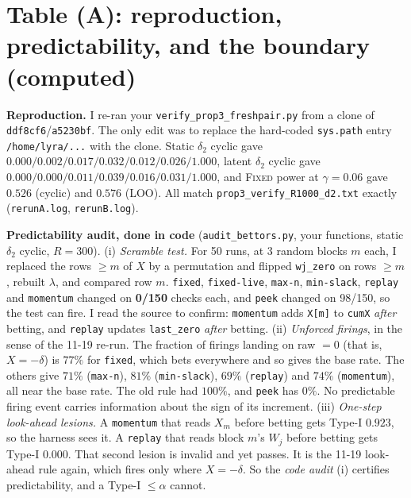 \documentclass[11pt]{article}
\begin{document}
\section{Table (A): reproduction, predictability, and the boundary (computed)}\label{sec:repro}
\textbf{Reproduction.} I re-ran your \texttt{verify\_prop3\_freshpair.py} from a clone of \texttt{ddf8cf6}/\texttt{a5230bf}. The only edit was to replace the hard-coded \texttt{sys.path} entry \texttt{/home/lyra/...} with the clone.
Static $\delta_2$ cyclic gave $0.000/0.002/0.017/0.032/0.012/0.026/1.000$, latent $\delta_2$ cyclic gave $0.000/0.000/0.011/0.039/0.016/0.031/1.000$, and \textsc{Fixed} power at $\gamma=0.06$ gave $0.526$ (cyclic) and $0.576$ (LOO). All match \texttt{prop3\_verify\_R1000\_d2.txt} exactly (\texttt{rerunA.log}, \texttt{rerunB.log}).

\textbf{Predictability audit, done in code} (\texttt{audit\_bettors.py}, your functions, static $\delta_2$ cyclic, $R=300$).
(i) \emph{Scramble test.} For 50 runs, at 3 random blocks $m$ each, I replaced the rows $\ge m$ of $X$ by a permutation and flipped \texttt{wj\_zero} on rows $\ge m$, rebuilt $\lambda$, and compared row $m$. \texttt{fixed}, \texttt{fixed-live}, \texttt{max-n}, \texttt{min-slack}, \texttt{replay} and \texttt{momentum} changed on \textbf{0/150} checks each, and \texttt{peek} changed on 98/150, so the test can fire.
I read the source to confirm: \texttt{momentum} adds \texttt{X[m]} to \texttt{cumX} \emph{after} betting, and \texttt{replay} updates \texttt{last\_zero} \emph{after} betting.
(ii) \emph{Unforced firings}, in the sense of the 11-19 re-run. The fraction of firings landing on raw $=0$ (that is, $X=-\delta$) is $77\%$ for \texttt{fixed}, which bets everywhere and so gives the base rate. The others give $71\%$ (\texttt{max-n}), $81\%$ (\texttt{min-slack}), $69\%$ (\texttt{replay}) and $74\%$ (\texttt{momentum}), all near the base rate. The old rule had $100\%$, and \texttt{peek} has $0\%$. No predictable firing event carries information about the sign of its increment.
(iii) \emph{One-step look-ahead lesions.} A \texttt{momentum} that reads $X_m$ before betting gets Type-I $\mathbf{0.923}$, so the harness sees it. A \texttt{replay} that reads block $m$'s $W_j$ before betting gets Type-I $\mathbf{0.000}$.
That second lesion is invalid and yet passes. It is the 11-19 look-ahead rule again, which fires only where $X=-\delta$. So the \emph{code audit} (i) certifies predictability, and a Type-I $\le\alpha$ cannot.
\end{document}
